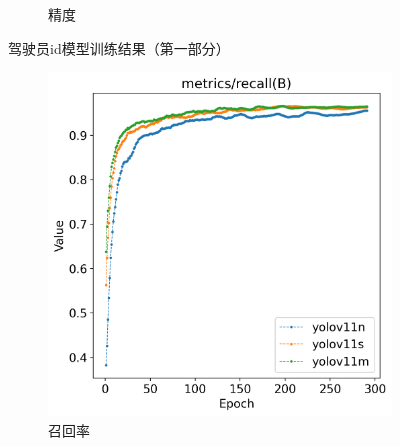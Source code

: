 \begin{figure}[H]
\begin{subfigure}[t]{0.43\textwidth}
        \caption{精度}
        \label{fig:track_metrics_precision}
    \end{subfigure}
    \caption{驾驶员id模型训练结果（第一部分）}
    \label{fig:trackResult_part1}
\end{figure}

\newpage %

\begin{figure}[H]
    \centering
    \begin{subfigure}[t]{0.43\textwidth}
        \centering
        \includegraphics[width=\textwidth]{figs/chap04/track_result/track_metrics_recall(B).png}
        \caption{召回率}
        \label{fig:track_metrics_recall}
    \end{subfigure}
    \begin{subfigure}[t]{0.43\textwidth}
        \centering

\end{subfigure}
\end{figure}
